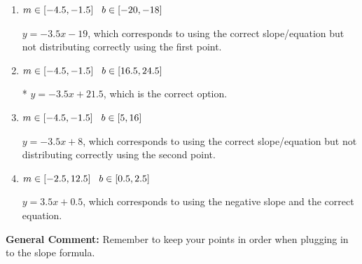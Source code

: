 \documentclass{extbook}[14pt]
\begin{document}
\begin{enumerate}
{\begin{enumerate}[label=\Alph*.]
 $y = -3.5x -21.5$, which corresponds to using the correct slope and getting the negative y-intercept.
\item \( m \in [-4.5, -1.5] \hspace*{3mm} b \in [-20, -18] \)

 $y = -3.5x -19$, which corresponds to using the correct slope/equation but not distributing correctly using the first point.
\item \( m \in [-4.5, -1.5] \hspace*{3mm} b \in [16.5, 24.5] \)

* $y = -3.5x + 21.5$, which is the correct option.
\item \( m \in [-4.5, -1.5] \hspace*{3mm} b \in [5, 16] \)

 $y = -3.5x + 8$, which corresponds to using the correct slope/equation but not distributing correctly using the second point.
\item \( m \in [-2.5, 12.5] \hspace*{3mm} b \in [0.5, 2.5] \)

 $y = 3.5x + 0.5$, which corresponds to using the negative slope and the correct equation.
\end{enumerate}

\textbf{General Comment:} Remember to keep your points in order when plugging in to the slope formula.
}
\end{enumerate}
\end{document}
